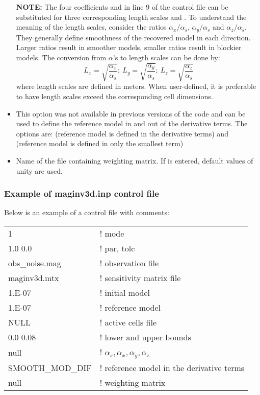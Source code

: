 \begin{itemize}
\textbf{NOTE:} The four coefficients  and  in line 9 of the control file can be substituted for three corresponding length scales  and . To understand the meaning of the length scales, consider the ratios $\alpha_x/\alpha_s$, $\alpha_y/\alpha_s$ and $\alpha_z/\alpha_s$. They generally define smoothness of the recovered model in each direction. Larger ratios result in smoother models, smaller ratios result in blockier models. The conversion from $\alpha$'s to length scales can be done by:
\begin{equation}
\label{eq:lengths}
L_x = \sqrt{\frac{\alpha_x}{\alpha_s}} ; ~L_y = \sqrt{\frac{\alpha_y}{\alpha_s}} ; ~L_z = \sqrt{\frac{\alpha_z}{\alpha_s}}
\end{equation}
where length scales are defined in meters. When user-defined, it is preferable to have length scales exceed the corresponding cell dimensions.

\item [\fileName{SMOOTH\_MOD}] This option was not available in previous versions of the code and can be used to define the reference model in and out of the derivative terms. The options are:  (reference model is defined in the derivative terms) and  (reference model is defined in only the smallest term)
\item[\fileName{w.dat}] Name of the file containing weighting matrix. If  is entered, default values of unity are used.
\end{itemize}

\subsubsection*{Example of maginv3d.inp control file}
Below is an example of a control file with comments:
\begin{fileExample}
\begin{tabular}{|ll|}
\hline
1  & ! mode \\
1.0 0.0 & ! par, tolc \\
obs\_noise.mag & ! observation file \\
maginv3d.mtx & ! sensitivity matrix file \\
1.E-07 & ! initial model\\
1.E-07 & ! reference model\\
NULL & ! active cells file\\
0.0 0.08 & ! lower and upper bounds \\
null & ! $\alpha_s, \alpha_x, \alpha_y, \alpha_z$ \\
SMOOTH\_MOD\_DIF & ! reference model in the derivative terms \\
null & ! weighting matrix \\
\hline
\end{tabular}
\end{fileExample}

